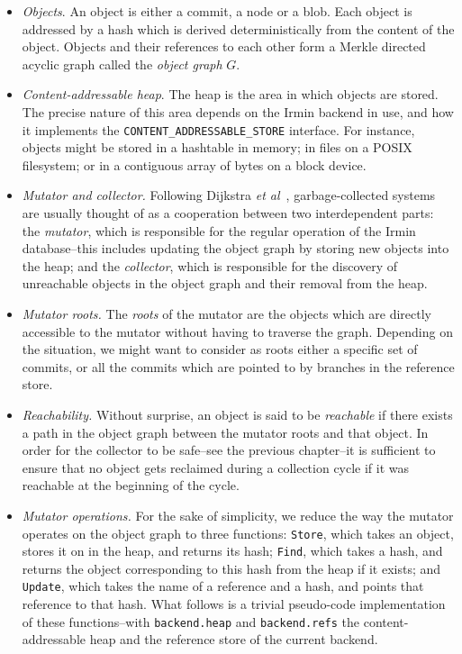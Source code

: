 \begin{itemize}
  \item\emph{Objects}.
        An object is either a commit, a node or a blob. Each object is addressed by a hash which is derived deterministically from the content of the object. Objects and their references to each other form a Merkle directed acyclic graph called the \emph{object graph} \(G\).

  \item\emph{Content-addressable heap}.
        The heap is the area in which objects are stored. The precise nature of this area depends on the Irmin backend in use, and how it implements the \texttt{CONTENT\_ADDRESSABLE\_STORE} interface. For instance, objects might be stored in a hashtable in memory; in files on a POSIX filesystem; or in a contiguous array of bytes on a block device.

  \item\emph{Mutator and collector.}
        Following Dijkstra \emph{et al}~\cite{dijkstra78}, garbage-collected systems are usually thought of as a cooperation between two interdependent parts: the \emph{mutator}, which is responsible for the regular operation of the Irmin database--this includes updating the object graph by storing new objects into the heap; and the \emph{collector}, which is responsible for the discovery of unreachable objects in the object graph and their removal from the heap.

  \item\emph{Mutator roots.}
        The \emph{roots} of the mutator are the objects which are directly accessible to the mutator without having to traverse the graph. Depending on the situation, we might want to consider as roots either a specific set of commits, or all the commits which are pointed to by branches in the reference store.

  \item\emph{Reachability.}
        Without surprise, an object is said to be \emph{reachable} if there exists a path in the object graph between the mutator roots and that object. In order for the collector to be safe--see the previous chapter--it is sufficient to ensure that no object gets reclaimed during a collection cycle if it was reachable at the beginning of the cycle.

  \item\emph{Mutator operations.}
        For the sake of simplicity, we reduce the way the mutator operates on the object graph to three functions: \texttt{Store}, which takes an object, stores it on in the heap, and returns its hash; \texttt{Find}, which takes a hash, and returns the object corresponding to this hash from the heap if it exists; and \texttt{Update}, which takes the name of a reference and a hash, and points that reference to that hash. What follows is a trivial pseudo-code implementation of these functions--with \texttt{backend.heap} and \texttt{backend.refs} the content-addressable heap and the reference store of the current backend.


\end{itemize}
